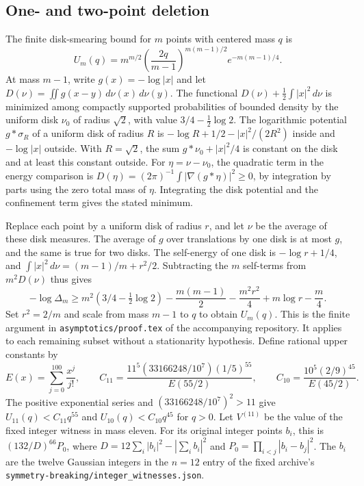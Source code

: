 \documentclass[11pt,letterpaper]{article}
\theoremstyle{remark}
\begin{document}
\subsection{One- and two-point deletion}

The finite disk-smearing bound for \(m\) points with centered mass \(q\)
is
\[
 U_m(q)=m^{m/2}\left(\frac{2q}{m-1}\right)^{m(m-1)/2}
 e^{-m(m-1)/4}.
\]
At mass \(m-1\), write \(g(x)=-\log|x|\) and let
\(D(\nu)=\iint g(x-y)\,d\nu(x)\,d\nu(y)\). The functional
\(D(\nu)+\tfrac12\int |x|^2\,d\nu\) is minimized among compactly supported
probabilities of bounded density by the uniform disk \(\nu_0\) of radius
\(\sqrt2\), with value \(3/4-\tfrac12\log2\). The logarithmic potential
\(g*\sigma_R\) of a uniform disk of radius \(R\) is
\(-\log R+1/2-|x|^2/(2R^2)\) inside and \(-\log|x|\) outside. With
\(R=\sqrt2\), the sum \(g*\nu_0+|x|^2/4\) is constant on the disk and
at least this constant outside. For \(\eta=\nu-\nu_0\), the quadratic
term in the energy comparison is
\(D(\eta)=(2\pi)^{-1}\int|\nabla(g*\eta)|^2\ge0\), by integration by
parts using the zero total mass of \(\eta\). Integrating the disk
potential and the confinement term gives the stated minimum.

Replace each point by a uniform disk of radius \(r\), and let \(\nu\)
be the average of these disk measures. The average of \(g\) over
translations by one disk is at most \(g\), and the same is true for
two disks. The self-energy of one disk is \(-\log r+1/4\), and
\(\int |x|^2\,d\nu=(m-1)/m+r^2/2\). Subtracting the \(m\) self-terms
from \(m^2D(\nu)\) thus gives
\[
 -\log\Delta_m\ge m^2(3/4-\tfrac12\log2)
 -\frac{m(m-1)}2-\frac{m^2r^2}4+m\log r-\frac m4.
\]
Set \(r^2=2/m\) and scale from mass \(m-1\) to \(q\) to obtain
\(U_m(q)\). This is the finite argument in
\texttt{asymptotics/proof.tex} of the accompanying repository. It
applies to each remaining subset without a stationarity hypothesis.
Define rational upper constants by
\[
 E(x)=\sum_{j=0}^{100}\frac{x^j}{j!},\qquad
 C_{11}=\frac{11^5(33166248/10^7)(1/5)^{55}}{E(55/2)},\qquad
 C_{10}=\frac{10^5(2/9)^{45}}{E(45/2)}.
\]
The positive exponential series and \((33166248/10^7)^2>11\) give
\(U_{11}(q)<C_{11}q^{55}\) and \(U_{10}(q)<C_{10}q^{45}\) for \(q>0\).
Let \(V^{(11)}\) be the value of the fixed integer witness in mass eleven.
For its original integer points \(b_i\), this is \((132/D)^{66}P_0\),
where \(D=12\sum_i|b_i|^2-|\sum_i b_i|^2\) and
\(P_0=\prod_{i<j}|b_i-b_j|^2\). The \(b_i\) are the twelve Gaussian
integers in the \(n=12\) entry of the fixed archive's
\texttt{symmetry-breaking/integer\_witnesses.json}.
\end{document}
